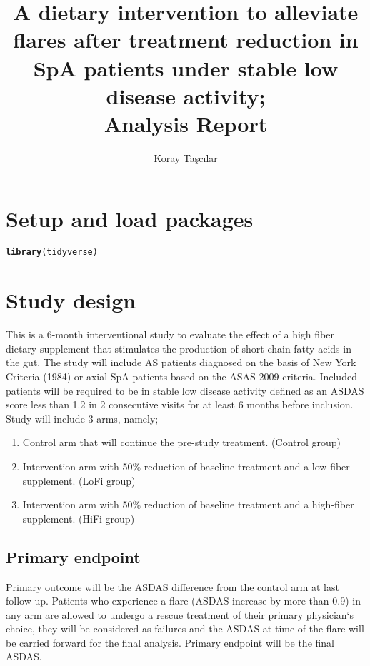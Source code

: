 \documentclass{article}\usepackage[]{graphicx}\usepackage[]{color}
\title{A dietary intervention to alleviate flares after treatment reduction in SpA patients under stable low disease activity;\\Analysis Report}
\author{Koray Taşcılar}
\makeatletter
\newcommand{\hlstd}[1]{\textcolor[rgb]{0.345,0.345,0.345}{#1}}%
\newcommand{\hlkwd}[1]{\textcolor[rgb]{0.737,0.353,0.396}{\textbf{#1}}}%
\newenvironment{kframe}{%
 \def\at@end@of@kframe{}%
 \ifinner\ifhmode%
  \def\at@end@of@kframe{\end{minipage}}%
  \begin{minipage}{\columnwidth}%
 \fi\fi%
 \def\FrameCommand##1{\hskip\@totalleftmargin \hskip-\fboxsep
 \colorbox{shadecolor}{##1}\hskip-\fboxsep
     \hskip-\linewidth \hskip-\@totalleftmargin \hskip\columnwidth}%
 \MakeFramed {\advance\hsize-\width
   \@totalleftmargin\z@ \linewidth\hsize
   \@setminipage}}%
 {\par\unskip\endMakeFramed%
 \at@end@of@kframe}
\newenvironment{knitrout}{}{} %
\makeatother
\begin{document}
\maketitle

\section{Setup and load packages}
\begin{knitrout}
\color{fgcolor}\begin{kframe}
\begin{alltt}
\hlkwd{library}\hlstd{(tidyverse)}
\end{alltt}
\end{kframe}
\end{knitrout}

\section {Study design}
This is a 6-month interventional study to evaluate the effect of a high fiber dietary supplement that stimulates the production of short chain fatty acids in the gut. The study will include AS patients diagnosed on the basis of New York Criteria (1984) or axial SpA patients based on the ASAS 2009 criteria. Included patients will be required to be in stable low disease activity defined as an ASDAS score less than 1.2 in 2 consecutive visits for at least 6 months before inclusion. Study will include 3 arms, namely;
\begin{enumerate}
  \item Control arm that will continue the pre-study treatment. (Control group)
  \item Intervention arm with 50\% reduction of baseline treatment and a low-fiber supplement. (LoFi group)
  \item Intervention arm with 50\% reduction of baseline treatment and a high-fiber supplement. (HiFi group)
\end{enumerate}
\subsection{Primary endpoint}
Primary outcome will be the ASDAS difference from the control arm at last follow-up.
Patients who experience a flare (ASDAS increase by more than 0.9) in any arm are allowed to undergo a rescue treatment of their primary physician‘s choice, they will be considered as failures and the ASDAS at time of the flare will be carried forward for the final analysis.
Primary endpoint will be the final ASDAS.
\end{document}
